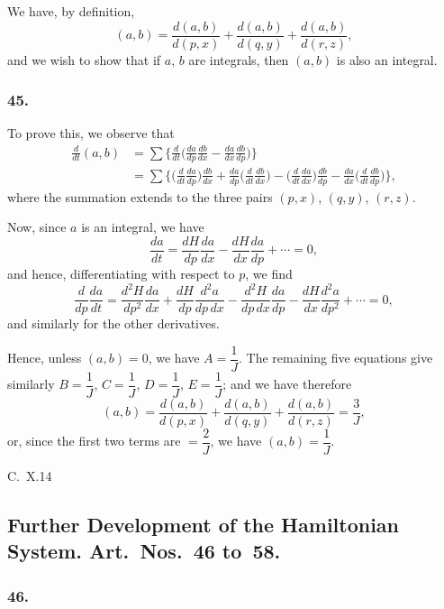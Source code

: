 \documentclass[12pt,a4paper]{article}
\theoremstyle{plain}
\begin{document}
We have, by definition,
\[
(a, b) = \frac{d(a, b)}{d(p, x)} + \frac{d(a, b)}{d(q, y)} + \frac{d(a, b)}{d(r, z)},
\]
and we wish to show that if $a$, $b$ are integrals, then $(a, b)$ is also an integral.

\subsubsection*{45.}

To prove this, we observe that
\begin{align*}
\frac{d}{dt}(a, b) &= \sum\biggl\{\frac{d}{dt}\biggl(\frac{da}{dp}\frac{db}{dx} - \frac{da}{dx}\frac{db}{dp}\biggr)\biggr\} \\
&= \sum\biggl\{\biggl(\frac{d}{dt}\frac{da}{dp}\biggr)\frac{db}{dx} + \frac{da}{dp}\biggl(\frac{d}{dt}\frac{db}{dx}\biggr) - \biggl(\frac{d}{dt}\frac{da}{dx}\biggr)\frac{db}{dp} - \frac{da}{dx}\biggl(\frac{d}{dt}\frac{db}{dp}\biggr)\biggr\},
\end{align*}
where the summation extends to the three pairs $(p, x)$, $(q, y)$, $(r, z)$.

Now, since $a$ is an integral, we have
\[
\frac{da}{dt} = \frac{dH}{dp}\frac{da}{dx} - \frac{dH}{dx}\frac{da}{dp} + \cdots = 0,
\]
and hence, differentiating with respect to $p$, we find
\[
\frac{d}{dp}\frac{da}{dt} = \frac{d^{2}H}{dp^{2}}\frac{da}{dx} + \frac{dH}{dp}\frac{d^{2}a}{dp\,dx} - \frac{d^{2}H}{dp\,dx}\frac{da}{dp} - \frac{dH}{dx}\frac{d^{2}a}{dp^{2}} + \cdots = 0,
\]
and similarly for the other derivatives.

\newpage
\setcounter{page}{130}

Hence, unless $(a, b) = 0$, we have $A = \dfrac{1}{J}$. The remaining five equations give similarly $B = \dfrac{1}{J}$, $C = \dfrac{1}{J}$, $D = \dfrac{1}{J}$, $E = \dfrac{1}{J}$; and we have therefore
\[
(a, b) = \frac{d(a, b)}{d(p, x)} + \frac{d(a, b)}{d(q, y)} + \frac{d(a, b)}{d(r, z)} = \frac{3}{J},
\]
or, since the first two terms are $= \dfrac{2}{J}$, we have $(a, b) = \dfrac{1}{J}$.

\medskip\noindent\textsc{C.~X.}\hfill 14

\newpage
\setcounter{page}{131}

\subsection*{Further Development of the Hamiltonian System. Art.~Nos.~46 to~58.}

\subsubsection*{46.}
\end{document}
